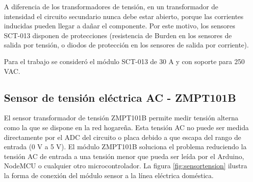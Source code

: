 







A diferencia de los transformadores de tensión, en un transformador de intensidad el circuito secundario nunca debe estar abierto, porque las corrientes inducidas pueden llegar a dañar el componente. Por este motivo, los sensores SCT-013 disponen de protecciones (resistencia de Burden en los sensores de salida por tensión, o diodos de protección en los sensores de salida por corriente)\citep{WEBSITE:9}.

Para el trabajo se consideró el módulo SCT-013 de 30 A y con soporte para 250 VAC.
\subsection{Sensor de tensión eléctrica AC - ZMPT101B}

El sensor transformador de tensión ZMPT101B permite medir tensión alterna como la que se dispone en la red hogareña. Esta tensión AC no puede ser medida directamente por el ADC del circuito o placa debido a que escapa del rango de entrada (0 V a 5 V). El módulo ZMPT101B soluciona el problema reduciendo la tensión AC de entrada a una tensión menor que pueda ser leída por el Arduino, NodeMCU o cualquier otro microcontrolador. La figura \ref{fig:sensortension} ilustra la forma de conexión del módulo sensor a la línea eléctrica doméstica.

